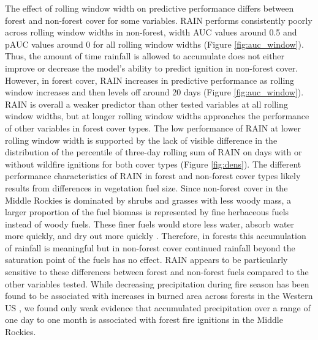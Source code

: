 \documentclass[11p]{article}
\begin{document}
The effect of rolling window width on predictive performance differs between forest and non-forest cover for some variables. RAIN performs consistently poorly across rolling window widths in non-forest, width AUC values around 0.5 and pAUC values around 0 for all rolling window widths (Figure \ref{fig:auc_window}). Thus, the amount of time rainfall is allowed to accumulate does not either improve or decrease the model's ability to predict ignition in non-forest cover. However, in forest cover, RAIN increases in predictive performance as rolling window increases and then levels off around 20 days (Figure \ref{fig:auc_window}). RAIN is overall a weaker predictor than other tested variables at all rolling window widths, but at longer rolling window widths approaches the performance of other variables in forest cover types. The low performance of RAIN at lower rolling window width is supported by the lack of visible difference in the distribution of the percentile of three-day rolling sum of RAIN on days with or without wildfire ignitions for both cover types (Figure \ref{fig:dens}). The different performance characteristics of RAIN in forest and non-forest cover types likely results from differences in vegetation fuel size. Since non-forest cover in the Middle Rockies is dominated by shrubs and grasses with less woody mass, a larger proportion of the fuel biomass is represented by fine herbaceous fuels instead of woody fuels. These finer fuels would store less water, absorb water more quickly, and dry out more quickly \citep{vineyReviewFineFuel1991}. Therefore, in forests this accumulation of rainfall is meaningful but in non-forest cover continued rainfall beyond the saturation point of the fuels has no effect. RAIN appears to be particularly sensitive to these differences between forest and non-forest fuels compared to the other variables tested. While decreasing precipitation during fire season has been found to be associated with increases in burned area across forests in the Western US \citep{holdenDecreasingFireSeason2018}, we found only weak evidence that accumulated precipitation over a range of one day to one month is associated with forest fire ignitions in the Middle Rockies.
\end{document}
